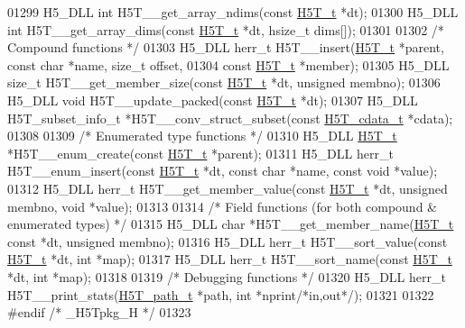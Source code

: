 \begin{DoxyCode}
01299 H5\_DLL \textcolor{keywordtype}{int}    H5T\_\_get\_array\_ndims(\textcolor{keyword}{const} \hyperlink{struct_h5_t__t}{H5T\_t} *dt);
01300 H5\_DLL \textcolor{keywordtype}{int}    H5T\_\_get\_array\_dims(\textcolor{keyword}{const} \hyperlink{struct_h5_t__t}{H5T\_t} *dt, hsize\_t dims[]);
01301 
01302 \textcolor{comment}{/* Compound functions */}
01303 H5\_DLL herr\_t H5T\_\_insert(\hyperlink{struct_h5_t__t}{H5T\_t} *parent, \textcolor{keyword}{const} \textcolor{keywordtype}{char} *name, \textcolor{keywordtype}{size\_t} offset,
01304         \textcolor{keyword}{const} \hyperlink{struct_h5_t__t}{H5T\_t} *member);
01305 H5\_DLL \textcolor{keywordtype}{size\_t} H5T\_\_get\_member\_size(\textcolor{keyword}{const} \hyperlink{struct_h5_t__t}{H5T\_t} *dt, \textcolor{keywordtype}{unsigned} membno);
01306 H5\_DLL \textcolor{keywordtype}{void} H5T\_\_update\_packed(\textcolor{keyword}{const} \hyperlink{struct_h5_t__t}{H5T\_t} *dt);
01307 H5\_DLL H5T\_subset\_info\_t *H5T\_\_conv\_struct\_subset(\textcolor{keyword}{const} \hyperlink{struct_h5_t__cdata__t}{H5T\_cdata\_t} *cdata);
01308 
01309 \textcolor{comment}{/* Enumerated type functions */}
01310 H5\_DLL \hyperlink{struct_h5_t__t}{H5T\_t} *H5T\_\_enum\_create(\textcolor{keyword}{const} \hyperlink{struct_h5_t__t}{H5T\_t} *parent);
01311 H5\_DLL herr\_t H5T\_\_enum\_insert(\textcolor{keyword}{const} \hyperlink{struct_h5_t__t}{H5T\_t} *dt, \textcolor{keyword}{const} \textcolor{keywordtype}{char} *name, \textcolor{keyword}{const} \textcolor{keywordtype}{void} *value);
01312 H5\_DLL herr\_t H5T\_\_get\_member\_value(\textcolor{keyword}{const} \hyperlink{struct_h5_t__t}{H5T\_t} *dt, \textcolor{keywordtype}{unsigned} membno, \textcolor{keywordtype}{void} *value);
01313 
01314 \textcolor{comment}{/* Field functions (for both compound & enumerated types) */}
01315 H5\_DLL \textcolor{keywordtype}{char}  *H5T\_\_get\_member\_name(\hyperlink{struct_h5_t__t}{H5T\_t} \textcolor{keyword}{const} *dt, \textcolor{keywordtype}{unsigned} membno);
01316 H5\_DLL herr\_t H5T\_\_sort\_value(\textcolor{keyword}{const} \hyperlink{struct_h5_t__t}{H5T\_t} *dt, \textcolor{keywordtype}{int} *map);
01317 H5\_DLL herr\_t H5T\_\_sort\_name(\textcolor{keyword}{const} \hyperlink{struct_h5_t__t}{H5T\_t} *dt, \textcolor{keywordtype}{int} *map);
01318 
01319 \textcolor{comment}{/* Debugging functions */}
01320 H5\_DLL herr\_t H5T\_\_print\_stats(\hyperlink{struct_h5_t__path__t}{H5T\_path\_t} *path, \textcolor{keywordtype}{int} *nprint\textcolor{comment}{/*in,out*/});
01321 
01322 \textcolor{preprocessor}{#endif }\textcolor{comment}{/* \_H5Tpkg\_H */}\textcolor{preprocessor}{}
01323 
\end{DoxyCode}
